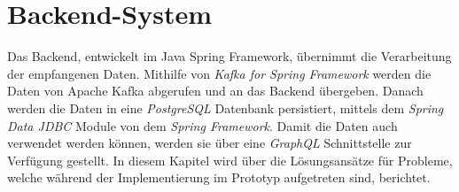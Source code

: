 \chapter{Backend-System}
\label{chp:backend}

Das Backend, entwickelt im Java Spring Framework, übernimmt die Verarbeitung der empfangenen Daten. Mithilfe von \emph{Kafka for Spring Framework} werden die Daten von Apache Kafka abgerufen und an das Backend übergeben. Danach werden die Daten in eine \emph{PostgreSQL} Datenbank persistiert, mittels dem \emph{Spring Data JDBC} Module von dem \emph{Spring Framework}. Damit die Daten auch verwendet werden können, werden sie über eine \emph{GraphQL} Schnittstelle zur Verfügung gestellt. In diesem Kapitel wird über die Lösungsansätze für Probleme, welche während der Implementierung im Prototyp aufgetreten sind, berichtet.




